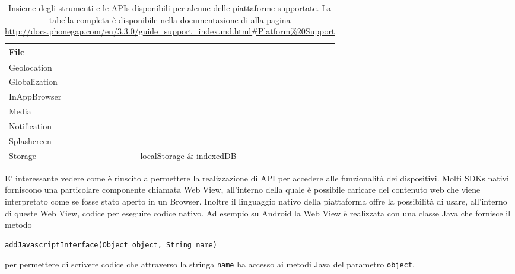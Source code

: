 {\begin{table}
\begin{tabularx}{\textwidth}{|l*{7}{|s}|}
                        \tabularnewline
                        \hline
                        File & \sprt{} & \sprt{} & \sprt{} & \sprt{} & \notsprt{}
                        \tabularnewline
                        \hline
                        Geolocation & \sprt{} & \sprt{} & \sprt{} & \sprt{} & \sprt{}
                        \tabularnewline
                        \hline
                        Globalization & \sprt{} & \notsprt{} & \sprt{} & \sprt{} &
                        \notsprt{}
                        \tabularnewline
                        \hline
                        InAppBrowser & \sprt{} & \sprt{} & \sprt{} & \sprt{} & \notsprt{}
                        \tabularnewline
                        \hline
                        Media & \sprt{} & \sprt{} & \sprt{} & \sprt{} & \sprt{}
                        \tabularnewline
                        \hline
                        Notification & \sprt{} & \sprt{} & \sprt{} & \sprt{} & \sprt{}
                        \tabularnewline
                        \hline
                        Splashcreen & \sprt{} & \sprt{} & \sprt{} & \sprt{} & \notsprt{}
                        \tabularnewline
                        \hline
                        Storage & \sprt{} & \sprt{} & \sprt{} & \sprt{} localStorage
                        \& indexedDB & \notsprt{}
                        \tabularnewline
                        \hline
                    \end{tabularx}
                    \caption{Insieme degli strumenti e le
                    APIs disponibili per alcune delle piattaforme supportate.
                    La tabella completa è disponibile nella documentazione
                    di \pg{} alla pagina \url{http://docs.phonegap.com/en/3.3.0/guide_support_index.md.html\#Platform\%20Support}}
                    \label{fig:platformsupport}
                \end{table}
            }

            E' interessante vedere come \pg{} è riuscito a permettere la
            realizzazione di API \js{} per accedere alle funzionalità
            dei dispositivi.
            Molti SDKs nativi forniscono una particolare componente chiamata
            Web View, all'interno della quale è possibile caricare del contenuto
            web che viene interpretato come se fosse stato aperto in
            un Browser.
            Inoltre il linguaggio nativo della piattaforma offre la possibilità
            di usare, all'interno di queste Web View, codice \js{} per
            eseguire codice nativo.
            Ad esempio su Android la Web View è realizzata con una classe Java
            che fornisce il metodo
    \begin{lstlisting}[language=MyJava]
  addJavascriptInterface(Object object, String name)
    \end{lstlisting}
            per permettere
            di scrivere codice \js{} che attraverso la stringa \texttt{name} ha accesso
            ai metodi Java del parametro \texttt{object}.

